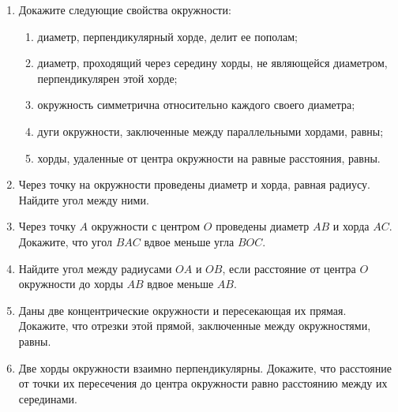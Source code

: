 \documentclass[12pt, a4paper]{article}
\begin{document}
	
	\begin{enumerate}
		\item Докажите следующие свойства окружности:
			\begin{enumerate}[label=\asbuk*)]
			\item  диаметр, перпендикулярный хорде, делит ее пополам;
			\item  диаметр, проходящий через середину хорды, не являющейся диаметром, перпендикулярен этой хорде;
			\item окружность симметрична относительно каждого своего
			диаметра;
			\item  дуги окружности, заключенные между параллельными
			хордами, равны;
			\item  хорды, удаленные от центра окружности на равные расстояния, равны.
			\end{enumerate}
		\item Через точку на окружности проведены диаметр и хорда, равная радиусу. Найдите угол между ними.
		\item Через точку $A$ окружности с центром $O$ проведены диаметр $AB$ и хорда $AC$. Докажите, что угол $BAC$ вдвое меньше угла $BOC$.
		\item Найдите угол между радиусами $OA$ и $OB$, если расстояние от центра $O$ окружности до хорды $AB$ вдвое меньше $AB$.
		\item Даны две концентрические окружности и пересекающая их прямая. Докажите, что отрезки этой прямой, заключенные между окружностями, равны.
		\item Две хорды окружности взаимно перпендикулярны. Докажите, что расстояние от точки их пересечения до центра окружности равно расстоянию между их серединами.
	\end{enumerate}
\end{document}
